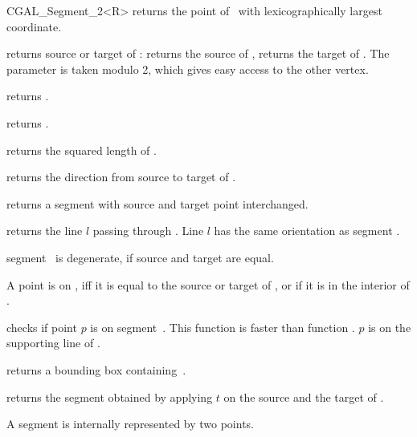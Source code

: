\begin {classtemplate} {CGAL_Segment_2<R>}
       {returns the point of \var\ with lexicographically largest coordinate.}


       {returns source or target   of \var:    returns
        the source of \var,  returns the target of \var. 
        The parameter  is taken modulo 2, which gives 
        easy access to the other vertex. }

	{returns .}

       {returns .}

       {returns the squared length of \var. }

       {returns the direction from source to target of \var.}


       {returns a segment with source and target point interchanged.}

       {returns the line $l$ passing through \var. Line $l$  has the
same orientation as segment \var.}

       {segment \var\ is degenerate, if source and target are equal.}

       {}

       {}

       {A point is on \var, iff it is equal to the source or target 
        of \var, or if it is in the interior of \var.}

       {checks if point $p$ is on segment~\var. This function is faster
        than function .
        \precond $p$ is on the supporting line of \var.}

       {returns a bounding box containing~\var.}

       {returns the segment obtained by applying $t$ on the source
        and the target of \var.}

\implementation
A segment is internally represented by two points. 


\end {classtemplate} 

%
%
%
